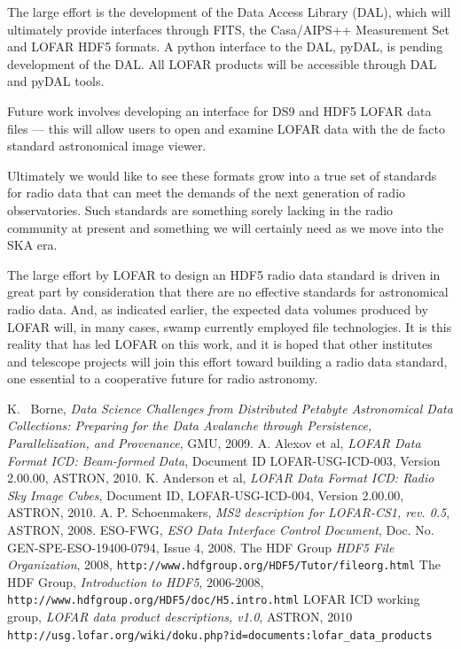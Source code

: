 \documentclass{PoS}
\begin{document}
The large effort is the development of the Data Access Library (DAL),
which will ultimately provide interfaces through FITS, the
Casa/AIPS++ Measurement Set  and LOFAR HDF5 formats.  A python interface to the
DAL, pyDAL, is pending development of the DAL.   All LOFAR products will be
accessible through DAL and pyDAL tools. 

Future work involves developing an interface for DS9 and HDF5 LOFAR
data files --- this will allow users to open and examine LOFAR data
with the de facto standard  astronomical image viewer.

Ultimately we would like to see these formats grow into a true set of standards for radio data that can meet the demands of the next generation of radio observatories. Such standards are something sorely lacking in the radio community at present and something we will certainly need as we move into the SKA era.

The large effort by LOFAR to design an HDF5 radio data standard is
driven in great part by consideration that there are no
effective standards for astronomical radio data.  And, as indicated earlier,
the expected data volumes produced by LOFAR will, in many cases,
swamp currently employed file technologies.  It is this reality that has led LOFAR
on this work, and it is hoped that other institutes and telescope projects will join this effort toward building a radio data standard, one essential to a cooperative future for
radio astronomy.

\begin{thebibliography}{99} 

K. ~Borne, \emph{Data Science Challenges from Distributed Petabyte Astronomical Data Collections: Preparing for the Data Avalanche through Persistence, Parallelization, and Provenance}, GMU, 2009.
A. Alexov et al, \emph{LOFAR Data Format ICD: Beam-formed Data}, Document ID LOFAR-USG-ICD-003, Version 2.00.00, ASTRON, 2010.
K. Anderson et al, \emph{LOFAR Data Format ICD: Radio Sky Image Cubes}, Document ID, LOFAR-USG-ICD-004, Version 2.00.00, ASTRON, 2010.
 A. P. Schoenmakers, \emph{MS2 description for
    LOFAR-CS1, rev. 0.5}, ASTRON, 2008.
ESO-FWG, \emph{ESO Data Interface Control Document}, Doc. No. GEN-SPE-ESO-19400-0794, Issue 4, 2008.
The HDF Group \emph{HDF5 File Organization}, 2008, \verb|http://www.hdfgroup.org/HDF5/Tutor/fileorg.html|
 The HDF Group,  \emph{Introduction to HDF5}, 2006-2008, \verb|http://www.hdfgroup.org/HDF5/doc/H5.intro.html|
LOFAR ICD working group, \emph{LOFAR data product descriptions, v1.0}, ASTRON, 2010
\verb|http://usg.lofar.org/wiki/doku.php?id=documents:lofar_data_products|
\end{thebibliography}
\end{document}
